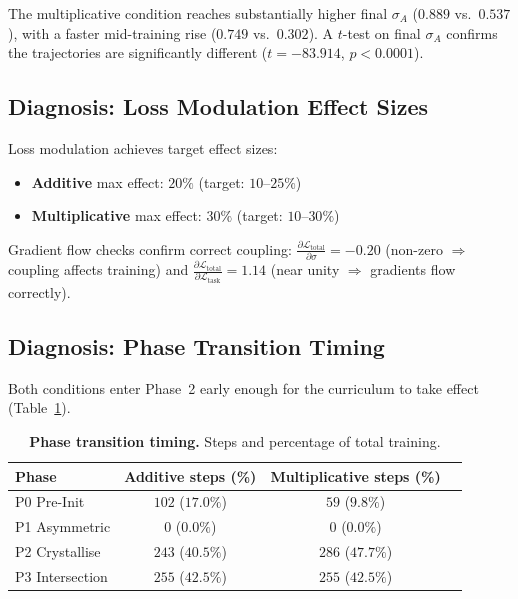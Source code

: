 \documentclass[11pt,a4paper]{article}
\begin{document}
The multiplicative condition reaches substantially higher final
$\sigma_A$ ($0.889$ vs.\ $0.537$), with a faster mid-training rise
($0.749$ vs.\ $0.302$). A $t$-test on final $\sigma_A$ confirms the
trajectories are significantly different ($t = -83.914$, $p < 0.0001$).

\subsection{Diagnosis: Loss Modulation Effect Sizes}

Loss modulation achieves target effect sizes:
\begin{itemize}[nosep]
\item \textbf{Additive} max effect: $20\%$ (target: $10$--$25\%$)
\item \textbf{Multiplicative} max effect: $30\%$ (target: $10$--$30\%$)
\end{itemize}
Gradient flow checks confirm correct coupling:
$\frac{\partial \mathcal{L}_{\text{total}}}{\partial \sigma} = -0.20$
(non-zero $\Rightarrow$ coupling affects training) and
$\frac{\partial \mathcal{L}_{\text{total}}}{\partial \mathcal{L}_{\text{task}}} = 1.14$
(near unity $\Rightarrow$ gradients flow correctly).

\subsection{Diagnosis: Phase Transition Timing}

Both conditions enter Phase~2 early enough for the curriculum to
take effect (Table~\ref{tab:phase-timing}).

\begin{table}[htbp]
\centering
\caption{\textbf{Phase transition timing.} Steps and percentage of
total training.\protect\footnotemark}
\label{tab:phase-timing}
\begin{tabular}{l c c c}
\toprule
\textbf{Phase} & \textbf{Additive steps (\%)} & \textbf{Multiplicative steps (\%)} \\
\midrule
P0 Pre-Init & $102$ ($17.0\%$) & $59$ ($9.8\%$) \\
P1 Asymmetric & $0$ ($0.0\%$) & $0$ ($0.0\%$) \\
P2 Crystallise & $243$ ($40.5\%$) & $286$ ($47.7\%$) \\
P3 Intersection & $255$ ($42.5\%$) & $255$ ($42.5\%$) \\
\bottomrule
\end{tabular}
\end{table}
\end{document}
